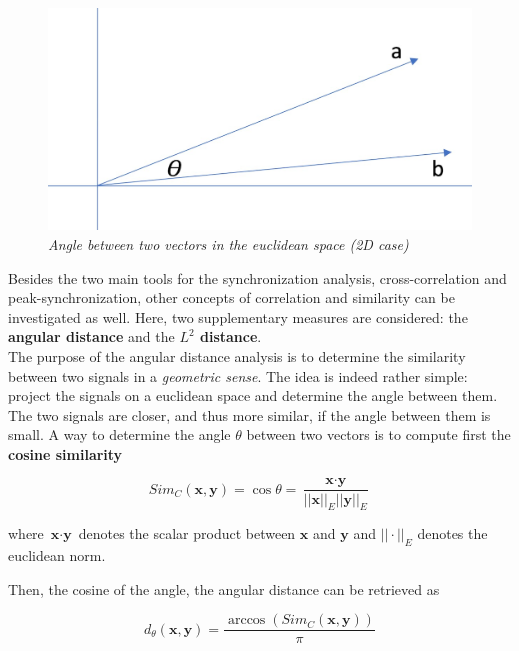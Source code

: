 \documentclass[a4paper]{article}
\begin{document}
\begin{figure}[H]
	\begin{center}
		\hspace*{-3.5cm}
		\includegraphics[scale=.20]{cos_sim.jpg} 
	\end{center} 
	\caption{\textit{Angle between two vectors in the euclidean space (2D case)}}
	
\end{figure}

Besides the two main tools for the synchronization analysis, cross-correlation and peak-synchronization, other concepts of correlation and similarity can be investigated as well. Here, two supplementary measures are considered: the \textbf{angular distance} and the \textbf{$L^2$ distance}.
\\

The purpose of the angular distance analysis is to determine the similarity between two signals in a \textit{geometric sense}. The idea is indeed rather simple: project the signals on a euclidean space and determine the angle between them. The two signals are closer, and thus more similar, if the angle between them is small.
A way to determine the angle $\theta$ between two vectors is to compute first the \textbf{cosine similarity}

$$ Sim_C(\textbf{x},\textbf{y}) = \cos \theta =  \frac{\textbf{x} \cdot \textbf{y}}{||\textbf{x}||_E ||\textbf{y}||_E} $$

where $\textbf{x} \cdot \textbf{y}$ denotes the scalar product between $\textbf{x}$ and $\textbf{y}$ and $ ||\cdot||_E$ denotes the euclidean norm.

Then, the cosine of the angle, the angular distance can be retrieved as

$$ d_\theta (\textbf{x},\textbf{y}) = \frac{\arccos(Sim_C(\textbf{x},\textbf{y}))}{\pi} $$
\end{document}
